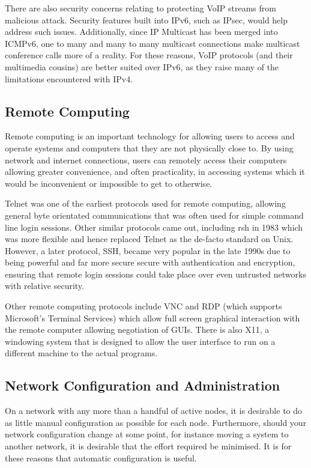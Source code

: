 \documentclass[a4paper,12pt]{article}
\begin{document}
There are also security concerns relating to protecting VoIP streams
from malicious attack. Security features built into IPv6, such as IPsec,
would help address such issues. Additionally, since IP Multicast has
been merged into ICMPv6, one to many and many to many multicast 
connections make multicast conference calls more of a reality. For these 
reasons, VoIP protocols (and their multimedia cousins) are better suited 
over IPv6, as they raise many of the limitations encountered with IPv4. 

\subsection{Remote Computing}

Remote computing is an important technology for allowing users to access
and operate systems and computers that they are not physically close 
to. By using network and internet connections, users can remotely access 
their computers allowing greater convenience, and often practicality, 
in accessing systems which it would be inconvenient or impossible to get 
to otherwise. 


Telnet was one of the earliest protocols used for remote computing, 
allowing general byte orientated communications that was often used for 
simple command line login sessions. Other similar protocols came out, 
including rsh in 1983 which was more flexible and hence replaced Telnet 
as the de-facto standard on Unix. However, a later protocol, SSH, became 
very popular in the late 1990s due to being powerful and far more secure 
secure with authentication and encryption, ensuring that remote login 
sessions could take place over even untrusted networks with relative 
security. 


Other remote computing protocols include VNC and RDP (which supports 
Microsoft's Terminal Services) which allow full screen graphical 
interaction with the remote computer allowing negotiation of GUIs. 
There is also X11, a windowing system that is designed to allow the 
user interface to run on a different machine to the actual programs.

\subsection{Network Configuration and Administration}

On a network with any more than a handful of active nodes, it is desirable to
do as little manual configuration as possible for each node. Furthermore,
should your network configuration change at some point, for instance moving a
system to another network, it is desirable that the effort required be
minimised. It is for these reasons that automatic configuration is useful.
\end{document}
